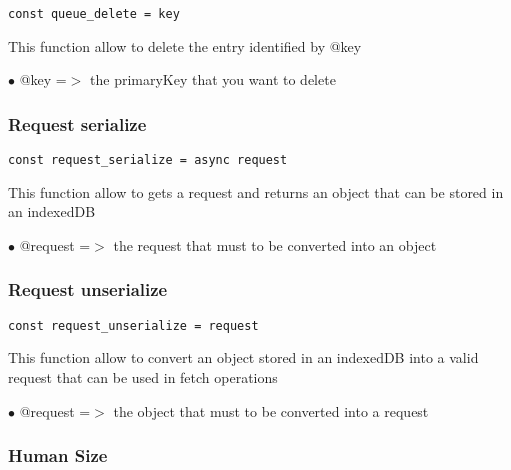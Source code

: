 \documentclass[a4paper]{article}
\begin{document}
\begin{lstlisting}
const queue_delete = key
\end{lstlisting}

This function allow to delete the entry identified by @key

\begin{compactitem}
\item[\color{myblue}$\bullet$] @key =$>$ the primaryKey that you want to delete
\end{compactitem}

\hypertarget{toc827}{}
\subsubsection{Request serialize}

\begin{lstlisting}
const request_serialize = async request
\end{lstlisting}

This function allow to gets a request and returns an object
that can be stored in an indexedDB

\begin{compactitem}
\item[\color{myblue}$\bullet$] @request =$>$ the request that must to be converted into an object
\end{compactitem}

\hypertarget{toc828}{}
\subsubsection{Request unserialize}

\begin{lstlisting}
const request_unserialize = request
\end{lstlisting}

This function allow to convert an object stored in an indexedDB
into a valid request that can be used in fetch operations

\begin{compactitem}
\item[\color{myblue}$\bullet$] @request =$>$ the object that must to be converted into a request
\end{compactitem}

\hypertarget{toc829}{}
\subsubsection{Human Size}
\end{document}

